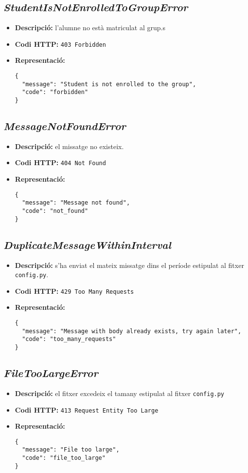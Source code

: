 \subsection{\emph{StudentIsNotEnrolledToGroupError}}
\begin{itemize}
	\item \textbf{Descripció:} l'alumne no està matriculat al grup.s
	\item \textbf{Codi \ac{HTTP}:} \texttt{403 Forbidden}
	\item \textbf{Representació:}
\begin{verbatim}
{
  "message": "Student is not enrolled to the group",
  "code": "forbidden"
}
\end{verbatim}
\end{itemize}

\subsection{\emph{MessageNotFoundError}}
\begin{itemize}
	\item \textbf{Descripció:} el missatge no existeix.
	\item \textbf{Codi \ac{HTTP}:} \texttt{404 Not Found}
	\item \textbf{Representació:}
\begin{verbatim}
{
  "message": "Message not found",
  "code": "not_found"
}
\end{verbatim}
\end{itemize}

\subsection{\emph{DuplicateMessageWithinInterval}}
\begin{itemize}
	\item \textbf{Descripció:} s'ha enviat el mateix missatge dins el període estipulat al fitxer \texttt{config.py}.
	\item \textbf{Codi \ac{HTTP}:} \texttt{429 Too Many Requests}
	\item \textbf{Representació:}
\begin{verbatim}
{
  "message": "Message with body already exists, try again later",
  "code": "too_many_requests"
}
\end{verbatim}
\end{itemize}

\subsection{\emph{FileTooLargeError}}
\begin{itemize}
	\item \textbf{Descripció:} el fitxer excedeix el tamany estipulat al fitxer \texttt{config.py}
	\item \textbf{Codi \ac{HTTP}:} \texttt{413 Request Entity Too Large}
	\item \textbf{Representació:}
\begin{verbatim}
{
  "message": "File too large",
  "code": "file_too_large"
}
\end{verbatim}
\end{itemize}
